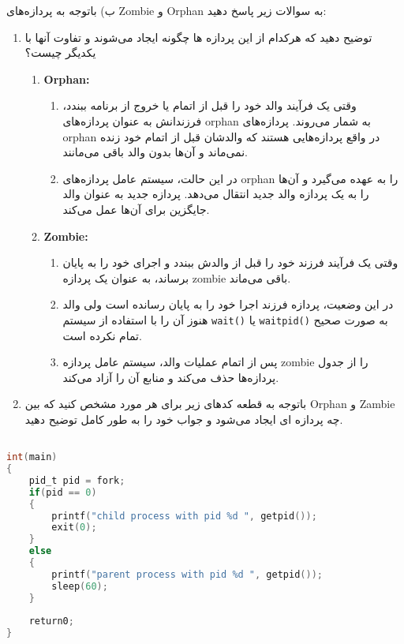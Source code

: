 ب) باتوجه به پردازه‌های Zombie و Orphan به سوالات زیر پاسخ دهید:
\begin{enumerate}
	\item توضیح دهید که هرکدام از این پردازه ها چگونه ایجاد می‌شوند و تفاوت آنها با یکدیگر چیست؟
	\begin{qsolve}
		\begin{enumerate}
			\item \textbf{Orphan: }
			\begin{enumerate}
				\item وقتی یک فرآیند والد خود را قبل از اتمام یا خروج از برنامه ببندد، فرزندانش به عنوان پردازه‌های orphan به شمار می‌روند. پردازه‌های orphan در واقع پردازه‌هایی هستند که والدشان قبل از اتمام خود زنده نمی‌ماند و آن‌ها بدون والد باقی می‌مانند.
				\item در این حالت، سیستم عامل پردازه‌های orphan را به عهده می‌گیرد و آن‌ها را به یک پردازه والد جدید انتقال می‌دهد. پردازه جدید به عنوان والد جایگزین برای آن‌ها عمل می‌کند.
			\end{enumerate}
			\item \textbf{Zombie: }
			\begin{enumerate}
				\item وقتی یک فرآیند فرزند خود را قبل از والدش ببندد و اجرای خود را به پایان برساند، به عنوان یک پردازه zombie باقی می‌ماند.
				\item در این وضعیت، پردازه فرزند اجرا خود را به پایان رسانده است ولی والد هنوز آن را با استفاده از سیستم \texttt{wait()} یا \texttt{waitpid()} به صورت صحیح تمام نکرده است.
				\item پس از اتمام عملیات والد، سیستم عامل پردازه zombie را از جدول پردازه‌ها حذف می‌کند و منابع آن را آزاد می‌کند.
			\end{enumerate}
		\end{enumerate}
	\end{qsolve}
	
	
	
	\item باتوجه به قطعه کد‌های زیر برای هر مورد مشخص کنید که بین Orphan و Zambie چه پردازه ای ایجاد می‌شود و جواب خود را به طور کامل توضیح دهید.
\end{enumerate}
\begin{latin}
\begin{lstlisting}[label=first,caption=Some Code, language=C]

int(main)
{
	pid_t pid = fork;
	if(pid == 0)
	{
		printf("child process with pid %d ", getpid());
		exit(0);
	}
	else
	{
		printf("parent process with pid %d ", getpid());
		sleep(60);
	}
	
	return0;
}

\end{lstlisting}
\end{latin}


